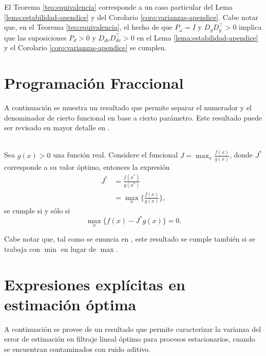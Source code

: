 El Teorema \ref{teo:equivalencia} corresponde a un caso particular del Lema \ref{lema:estabilidad-apendice} y del Corolario \ref{coro:varianzas-apendice}. 
Cabe notar que, en el Teorema \ref{teo:equivalencia}, el hecho de que $P_{\omega}=I$ y $D_yD_y^{\intercal}>0$ implica que las suposiciones $P_d>0$ y $D_{dv}D_{dv}^{\intercal}>0$ en el Lema \ref{lema:estabilidad-apendice} y el Corolario \ref{coro:varianzas-apendice} se cumplen.

\section{Programaci\'on Fraccional}\label{sec:desp-inf}
A continuaci\'on se muestra un resultado que permite separar el numerador y el denominador de cierto funcional en base a cierto par\'ametro. Este resultado puede ser revisado en mayor detalle en \cite{dinkelbach1967nonlinear}.
\begin{lema}\label{lema:dinkelbach}{\ \\}
Sea $g(x)>0$ una funci\'on real. Considere el funcional $J = \max_{x}{\frac{f(x)}{g(x)}}$, donde $J^*$ corresponde a su valor \'optimo, entonces la expresi\'on
\begin{align*}
J^*&=\frac{f(x^*)}{g(x^*)}\\
&=\max_{x}\{\frac{f(x)}{g(x)}\},
\end{align*}
se cumple si y s\'olo si
\begin{equation}
\max_{x}\{f(x)-J^*g(x)\}=0.
\end{equation}
\end{lema}
Cabe notar que, tal como se enuncia en \cite{dinkelbach1967nonlinear}, este resultado se cumple también si se trabaja con $\min$ en lugar de $\max$.

\section{Expresiones expl\'icitas en estimaci\'on \'optima}\label{sec:snyder}
A continuaci\'on se provee de un resultado que permite caracterizar la varianza del error de estimaci\'on en filtraje lineal \'optimo para procesos estacionarios, cuando se encuentran contaminados con ruido aditivo. 

